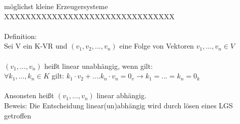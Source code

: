 \documentclass{scrartcl}
\begin{document}
	möglichst kleine Erzeugersysteme XXXXXXXXXXXXXXXXXXXXXXXXXXXXXXXX \\ \\
	Definition:\\
	Sei V ein K-VR und $(v_1, v_2, ... , v_n)$ eine Folge von Vektoren $v_1, ... , v_n \in V$\\
	\\
	$(v_1, ... , v_n)$ heißt linear unabhängig, wenn gilt:\\ $\forall k_1,...,k_n \in K$ gilt: $k_1 \cdot v_2 + ... . k_n \cdot v_n = 0_v \rightarrow k_1 = ... = k_n = 0_k$ \\ \\
	Ansonsten heißt $(v_1, ..., v_n)$ linear abhängig.
	\\
	Beweis: Die Entscheidung linear(un)abhängig wird durch lösen eines LGS getroffen
	\\ \\
	\newpage
\end{document}
